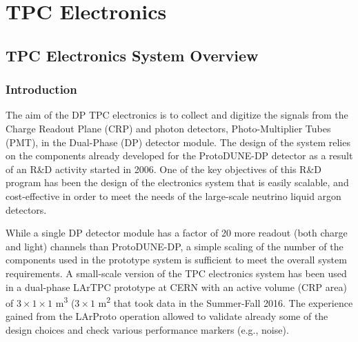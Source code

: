 \chapter{TPC Electronics}
\label{ch:fddp-tpc-elec}


\section{TPC Electronics System Overview}
\label{sec:fddp-tpc-elec-ov}

\subsection{Introduction}
\label{sec:fddp-tpc-elec-intro}

The aim of the DP TPC electronics is to collect and digitize the signals from the Charge Readout Plane (CRP) and photon detectors, Photo-Multiplier Tubes (PMT), in the Dual-Phase (DP) detector module. The design of the system relies on the components already developed for the ProtoDUNE-DP detector as a result of an R\&D activity started in 2006. One of the key objectives of this R\&D program has been the design of the electronics system that is easily scalable, and cost-effective in order to meet the needs of the large-scale neutrino liquid argon detectors.  

While a single DP detector module has a factor of \num{20} more readout (both charge and light) channels than ProtoDUNE-DP, a simple scaling of the number of the components used in the prototype system is sufficient to meet the overall system requirements. A small-scale version of the TPC electronics system has been used in a dual-phase LArTPC prototype at CERN with an active volume (CRP area) of $3\times 1 \times 1$ \si{\meter\cubed} ($3\times1$ \si{\meter\squared} that took data in the Summer-Fall 2016. The experience gained from the LArProto operation allowed to validate already some of the design choices and check various performance markers (e.g., noise). 

